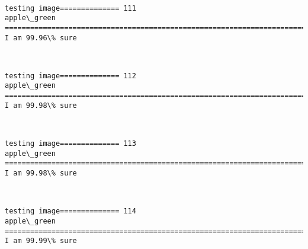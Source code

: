 \documentclass[11pt]{article}
\begin{document}
    \begin{center}
    \end{center}
    { \hspace*{\fill} \\}
    
    \begin{Verbatim}[commandchars=\\\{\}]
testing image============== 111
apple\_green
============================================================================
I am 99.96\% sure

    \end{Verbatim}

    \begin{center}
    \end{center}
    { \hspace*{\fill} \\}
    
    \begin{Verbatim}[commandchars=\\\{\}]
testing image============== 112
apple\_green
============================================================================
I am 99.98\% sure

    \end{Verbatim}

    \begin{center}
    \end{center}
    { \hspace*{\fill} \\}
    
    \begin{Verbatim}[commandchars=\\\{\}]
testing image============== 113
apple\_green
============================================================================
I am 99.98\% sure

    \end{Verbatim}

    \begin{center}
    \end{center}
    { \hspace*{\fill} \\}
    
    \begin{Verbatim}[commandchars=\\\{\}]
testing image============== 114
apple\_green
============================================================================
I am 99.99\% sure

    \end{Verbatim}
\end{document}
